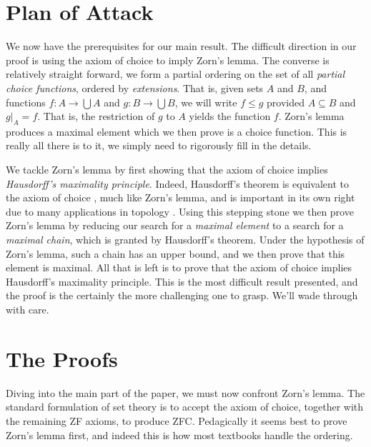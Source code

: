 \documentclass{article}
\theoremstyle{definition}
\begin{document}
    \section{Plan of Attack}
        We now have the prerequisites for our main result.
        The difficult direction in our proof is using the axiom of choice to
        imply Zorn's lemma. The converse is relatively straight forward, we
        form a partial ordering on the set of all
        \textit{partial choice functions}, ordered by \textit{extensions}.
        That is, given sets $A$ and $B$, and functions
        $f:A\rightarrow\bigcup{A}$ and $g:B\rightarrow\bigcup{B}$, we will
        write $f\leq{g}$ provided $A\subseteq{B}$ and
        $g|_{A}=f$. That is, the restriction of $g$ to $A$ yields the function
        $f$. Zorn's lemma produces a maximal element which we then prove is
        a choice function. This is really all there is to it, we simply need to
        rigorously fill in the details.
        \par\hfill\par
        We tackle Zorn's lemma by first showing that the axiom of choice
        implies \textit{Hausdorff's maximality principle}. Indeed, Hausdorff's
        theorem is equivalent to the axiom of choice
        \cite[p.~69]{Munkres2000}, much like Zorn's lemma, and is important in
        its own right due to many applications in topology
        \cite[p.~32]{KelleyTopology}.
        Using this stepping stone we then prove Zorn's lemma by
        reducing our search for a \textit{maximal element} to a search for a
        \textit{maximal chain}, which is granted by Hausdorff's theorem.
        Under the hypothesis of Zorn's lemma, such a chain has an upper bound,
        and we then prove that this element is maximal. All that is left is to
        prove that the axiom of choice implies Hausdorff's maximality principle.
        This is the most difficult result presented, and the proof is the
        certainly the more challenging one to grasp. We'll wade through
        with care.
    \section{The Proofs}
        Diving into the main part of the paper, we must now confront
        Zorn's lemma. The standard formulation of set theory is to accept the
        axiom of choice, together with the remaining ZF axioms, to produce
        ZFC. Pedagically it seems best to prove Zorn's lemma first, and indeed
        this is how most textbooks handle the ordering.
\end{document}

